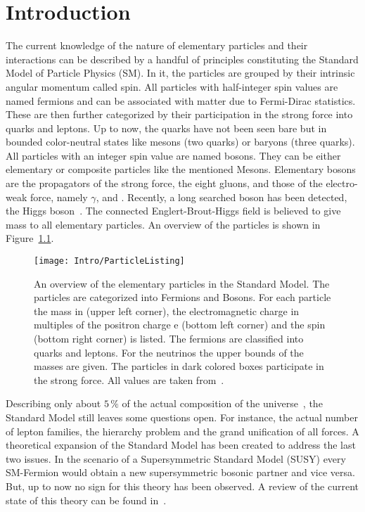 \chapter{Introduction \label{sec:Intro}}

The current knowledge of the nature of elementary particles and their interactions can be described by a handful of principles constituting the Standard Model of Particle Physics (SM). In it, the particles are grouped by their intrinsic angular momentum called spin. All particles with half-integer spin values are named fermions and can be associated with matter due to Fermi-Dirac statistics. These are then further categorized by their participation in the strong force into quarks and leptons. Up to now, the quarks have not been seen bare but in bounded color-neutral states like mesons (two quarks) or baryons (three quarks). All particles with an integer spin value are named bosons. They can be either elementary or composite particles like the mentioned Mesons. Elementary bosons are the propagators of the strong force, the eight gluons, and those of the electro-weak force, namely $\gamma{}$, \Zz{} and \Wpm{}. Recently, a long searched boson has been detected, the Higgs boson~\cite{Chatrchyan201230}. The connected Englert-Brout-Higgs field is believed to give mass to all elementary particles. An overview of the particles is shown in Figure~\ref{plot:IntroParticles}.

\begin{figure}[!htb]
  \centering
  \texttt{[image: Intro/ParticleListing]}
  \caption[Overview of the elementary particles]{An overview of the elementary particles in the Standard Model. The particles are categorized into Fermions and Bosons. For each particle the mass in \MeV (upper left corner), the electromagnetic charge in multiples of the positron charge e (bottom left corner) and the spin (bottom right corner) is listed. The fermions are classified into quarks and leptons. For the neutrinos the upper bounds of the masses are given. The particles in dark colored boxes participate in the strong force. All values are taken from~. \label{plot:IntroParticles} }
\end{figure}

Describing only about $5\,\%$ of the actual composition of the universe~, the Standard Model still leaves some questions open. For instance, the actual number of lepton families, the hierarchy problem and the grand unification of all forces. A theoretical expansion of the Standard Model has been created to address the last two issues. In the scenario of a Supersymmetric Standard Model (SUSY) every SM-Fermion would obtain a new supersymmetric bosonic partner and vice versa. But, up to now no sign for this theory has been observed. A review of the current state of this theory can be found in~\cite{Beringer:1900zz}.

